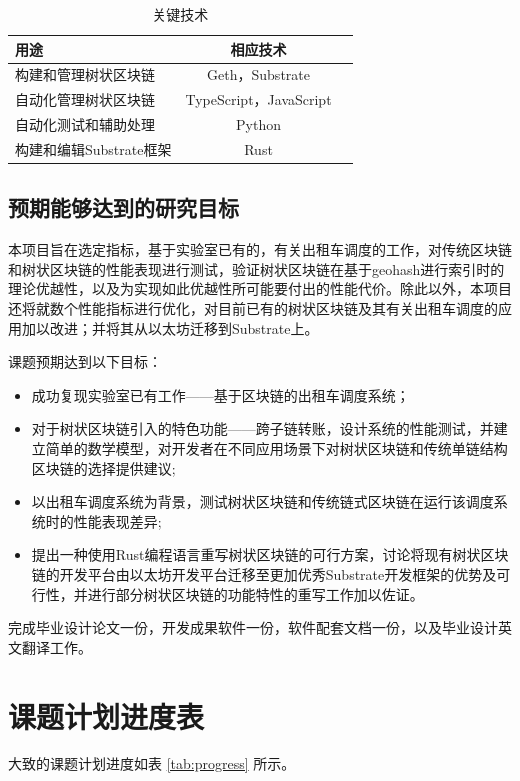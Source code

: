 \documentclass[type=undergraduate_proposal]{bitreport}
\begin{document}
\begin{table}[!ht]
  \centering
  \caption{关键技术}
  \label{tab:key-tech}
  \begin{tabular}{@{}lcl@{}}
    \toprule
    用途         & 相应技术                  \\
    \midrule
    构建和管理树状区块链 & Geth，Substrate        \\
    \midrule
    自动化管理树状区块链 & TypeScript，JavaScript \\
    \midrule
    自动化测试和辅助处理 & Python                \\
    \midrule
    构建和编辑Substrate框架 & Rust \\
    \bottomrule
  \end{tabular}
\end{table}


\subsection{预期能够达到的研究目标}
本项目旨在选定指标，基于实验室已有的，有关出租车调度的工作，对传统区块链和树状区块链的性能表现进行测试，验证树状区块链在基于geohash进行索引时的理论优越性，以及为实现如此优越性所可能要付出的性能代价。除此以外，本项目还将就数个性能指标进行优化，对目前已有的树状区块链及其有关出租车调度的应用加以改进；并将其从以太坊迁移到Substrate上。

课题预期达到以下目标：
\begin{itemize}
  \item 成功复现实验室已有工作——基于区块链的出租车调度系统；
  \item 对于树状区块链引入的特色功能——跨子链转账，设计系统的性能测试，并建立简单的数学模型，对开发者在不同应用场景下对树状区块链和传统单链结构区块链的选择提供建议;
  \item 以出租车调度系统为背景，测试树状区块链和传统链式区块链在运行该调度系统时的性能表现差异;
  \item 提出一种使用Rust编程语言重写树状区块链的可行方案，讨论将现有树状区块链的开发平台由以太坊开发平台迁移至更加优秀Substrate开发框架的优势及可行性，并进行部分树状区块链的功能特性的重写工作加以佐证。
\end{itemize}

完成毕业设计论文一份，开发成果软件一份，软件配套文档一份，以及毕业设计英文翻译工作。

\section{课题计划进度表}
大致的课题计划进度如表 \ref{tab:progress} 所示。
\end{document}
